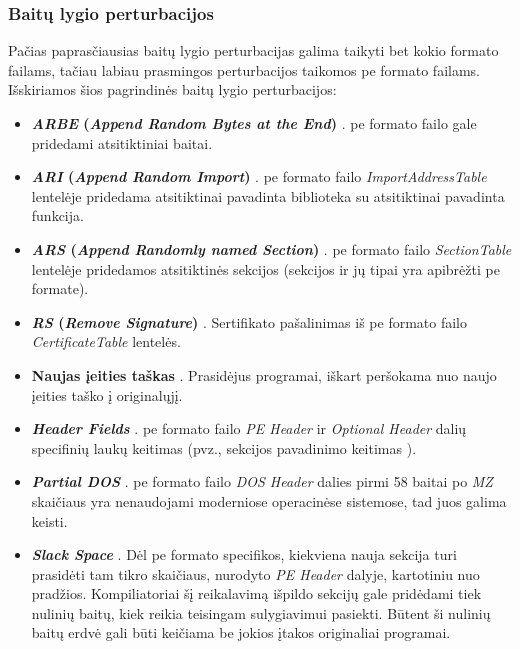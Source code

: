 \subsubsection{Baitų lygio perturbacijos}\label{sec:literature:perturbations:byte}
Pačias paprasčiausias baitų lygio perturbacijas galima taikyti bet kokio formato failams, tačiau labiau prasmingos perturbacijos taikomos \acs{pe} formato failams. Išskiriamos šios pagrindinės baitų lygio perturbacijos:
\begin{itemize}
    \item \textbf{\textit{ARBE} (\textit{Append Random Bytes at the End})} \cite{fangEvadingMalwareEngines2019}. \acs{pe} formato failo gale pridedami atsitiktiniai baitai.
    \item \textbf{\textit{ARI} (\textit{Append Random Import})} \cite{fangEvadingMalwareEngines2019}. \acs{pe} formato failo \textit{ImportAddressTable} lentelėje pridedama atsitiktinai pavadinta biblioteka su atsitiktinai pavadinta funkcija.
    \item \textbf{\textit{ARS} (\textit{Append Randomly named Section})} \cite{fangEvadingMalwareEngines2019}. \acs{pe} formato failo \textit{SectionTable} lentelėje pridedamos atsitiktinės sekcijos (sekcijos ir jų tipai yra apibrėžti \acs{pe} formate).
    \item \textbf{\textit{RS} (\textit{Remove Signature})} \cite{fangEvadingMalwareEngines2019}. Sertifikato pašalinimas iš \acs{pe} formato failo \textit{CertificateTable} lentelės.
    \item \textbf{Naujas įeities taškas} \cite{andersonLearningEvadeStatic2018}. Prasidėjus programai, iškart peršokama nuo naujo įeities taško į originalųjį.
    \item \textbf{\textit{Header Fields}} \cite{demetrioAdversarialEXEmplesSurvey2021}. \acs{pe} formato failo \textit{PE Header} ir \textit{Optional Header} dalių specifinių laukų keitimas (pvz., sekcijos pavadinimo keitimas \cite{andersonLearningEvadeStatic2018}).
    \item \textbf{\textit{Partial DOS}} \cite{demetrioAdversarialEXEmplesSurvey2021}. \acs{pe} formato failo \textit{DOS Header} dalies pirmi 58 baitai po \textit{MZ} skaičiaus yra nenaudojami moderniose operacinėse sistemose, tad juos galima keisti.
    \item \textbf{\textit{Slack Space}} \cite{demetrioAdversarialEXEmplesSurvey2021}. Dėl \acs{pe} formato specifikos, kiekviena nauja sekcija turi prasidėti tam tikro skaičiaus, nurodyto \textit{PE Header} dalyje, kartotiniu nuo pradžios. Kompiliatoriai šį reikalavimą išpildo sekcijų gale pridėdami tiek nulinių baitų, kiek reikia teisingam sulygiavimui pasiekti. Būtent ši nulinių baitų erdvė gali būti keičiama be jokios įtakos originaliai programai.

\end{itemize}
